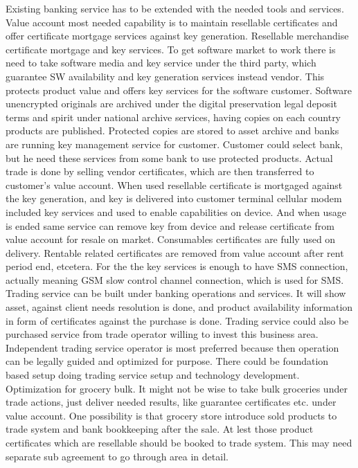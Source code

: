 Existing banking service has to be extended with the needed tools and
services. Value account most needed capability is to maintain resellable
certificates and offer certificate mortgage services against key generation.
Resellable merchandise certificate mortgage and key services.
To get software market to work there is need to take software media and key
service under the third party, which guarantee SW availability and key
generation services instead vendor. This protects product value and offers key
services for the software customer. Software unencrypted originals are
archived under the digital preservation legal
deposit\cite{EULegalDepositScheme} terms and spirit under national archive
services, having copies on each country products are published. Protected
copies are stored to asset archive and banks are running key management
service for customer. Customer could select bank, but he need these services
from some bank to use protected products. Actual trade is done by selling
vendor certificates, which are then transferred to customer's value account.
When used resellable certificate is mortgaged against the key generation, and
key is delivered into customer terminal cellular modem included key services
and used to enable capabilities on device. And when usage is ended same
service can remove key from device and release certificate from value account
for resale on market. Consumables certificates are fully used on delivery.
Rentable related certificates are removed from value account after rent period
end, etcetera. For the the key services is enough to have SMS connection,
actually meaning GSM slow control channel connection, which is used for SMS.
Trading service can be built under banking operations and services. It will
show asset, against client needs resolution is done, and product availability
information in form of certificates against the purchase is done. Trading
service could also be purchased service from trade operator willing to invest
this business area. Independent trading service operator is most preferred
because then operation can be legally guided and optimized for purpose. There
could be foundation based setup doing trading service setup and technology
development.
Optimization for grocery bulk.
It might not be wise to take bulk groceries under trade actions, just deliver
needed results, like guarantee certificates etc. under value account. One
possibility is that grocery store introduce sold products to trade system and
bank bookkeeping after the sale. At lest those product certificates which are
resellable should be booked to trade system. This may need separate sub
agreement to go through area in detail.


